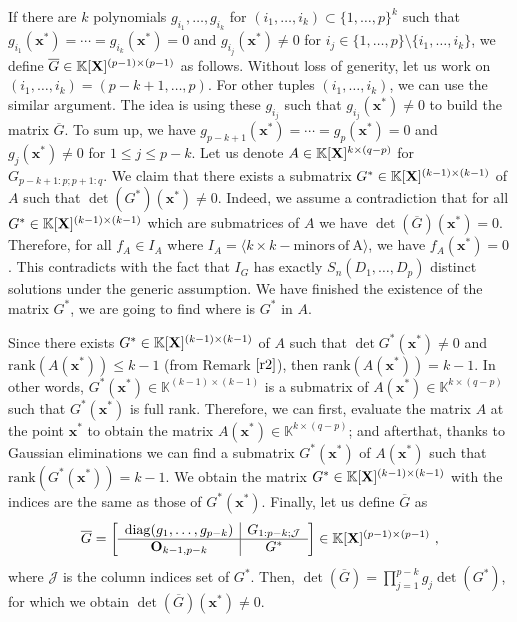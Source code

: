 \documentclass[11pt]{article}
\numberwithin{Property}{section}
\numberwithin{Theorem}{section}
\numberwithin{Proposition}{section}
\numberwithin{Lemma}{section}
\numberwithin{Corollary}{section}
\numberwithin{Definition}{section}
\numberwithin{Remark}{section}
\numberwithin{Conjecture}{section}
\numberwithin{Problem}{section}
\numberwithin{Example}{section}
\numberwithin{Claim}{section}
\renewcommand{\leq}{\leqslant}
\def\bar{\overline}
\newcommand{\field}{\mathbb{K}} %
\newcommand{\mat}[1]{\mathbf{\MakeUppercase{#1}}} %
\begin{document}
If there are $k$ polynomials $g_{i_1}, \ldots, g_{i_k}$ for $(i_1, \ldots, i_k) \subset \{1, \ldots, p\}^k$ such that $g_{i_1}(\mathbf{x}^*) = \cdots = g_{i_k}(\mathbf{x}^*) = 0$ and $g_{i_j}(\mathbf{x}^*) \ne 0$ for $i_j \in \{1, \ldots, p\} \setminus \{i_1, \ldots, i_k\}$, we define $\bar{G} \in \field[\mat{X}]^{(p-1) \times (p-1)}$ as follows. Without loss of generity, let us work on $(i_1, \ldots, i_k) = (p-k+1, \ldots, p)$. For other tuples $(i_1, \ldots, i_k)$, we can use the similar argument. The idea is using these $g_{i_j}$ such that $g_{i_j}(\mathbf{x}^*) \ne 0$ to build the matrix $\bar{G}$. To sum up, we have $g_{p-k+1}(\mathbf{x}^*) = \cdots = g_{p}(\mathbf{x}^*) = 0$ and $g_j(\mathbf{x}^*) \ne 0$ for $1 \leq j \leq p-k$. Let us denote $A \in \field[\mat{X}]^{k \times (q-p)}$ for $G_{p-k+1:p\mathbf{;}p+1:q}$. We claim that there exists a submatrix ${G}^* \in \field[\mat{X}]^{(k-1) \times (k-1)}$ of $A$ such that $\det({G}^*)(\mathbf{x}^*) \ne 0$. Indeed, we assume a contradiction that for all ${G}^* \in \field[\mat{X}]^{(k-1) \times (k-1)}$ which are submatrices of $A$ we have $\det(\bar{G})(\mathbf{x}^*) = 0$. Therefore, for all $f_{A} \in I_A$ where $I_A = \langle k \times k - \mathrm{minors \ of \ A}\rangle$, we have $f_A(\mathbf{x}^*) = 0$. This contradicts with the fact that $I_G$ has exactly $S_n(D_1, \ldots, D_p)$ distinct solutions under the generic assumption. We have finished the existence of the matrix ${G}^*$, we are going to find where is ${G}^*$ in $A$. 

Since there exists ${G}^* \in \field[\mat{X}]^{(k-1) \times (k-1)}$  of $A$ such that $\det{{G}^*}(\mathbf{x}^*) \ne 0$ and $\mathrm{rank}(A(\mathbf{x}^{*})) \leq k-1$ (from Remark $\ref{r2}$), then $\mathrm{rank}(A(\mathbf{x}^{*})) = k-1$. In other words, ${G}^*(\mathbf{x}^*) \in \field^{(k-1)\times (k-1)}$ is a submatrix of $A(\mathbf{x}^*) \in \field^{k \times (q-p)}$ such that ${G}^*(\mathbf{x}^*)$ is full rank. Therefore, we can first, evaluate the matrix $A$ at the point $\mathbf{x}^*$ to obtain the matrix $A(\mathbf{x}^*) \in \field^{k \times (q-p)}$; and afterthat, thanks to Gaussian eliminations we can find a submatrix ${G}^*(\mathbf{x}^*)$ of $A(\mathbf{x}^*)$ such that $\mathrm{rank}({G}^*(\mathbf{x}^*)) = k-1$.  We obtain the matrix ${G}^* \in \field[\mat{X}]^{(k-1) \times (k-1)}$ with the indices are the same as those of ${G}^*(\mathbf{x}^*)$. Finally, let us define $\bar{G}$ as 
$$\bar{G} = 
\left[\begin{array}{c |c}%
\mathrm{diag}(g_1, \ldots, g_{p-k}) & G_{1:p-k; \mathcal{J}} \\  \hline
\mat{O}_{k-1,p-k} & G^*\\
\end{array}
\right] \in \field[\mat{X}]^{(p-1) \times (p-1)} \ ,$$ where $\mathcal{J}$ is the column indices set of $G^*$. Then, $\det(\bar{G}) = \prod_{j = 1}^{p-k}g_j\det(G^*)$, for which we obtain $\det(\bar{G})(\mathbf{x}^*) \ne 0$. 
\end{document}
